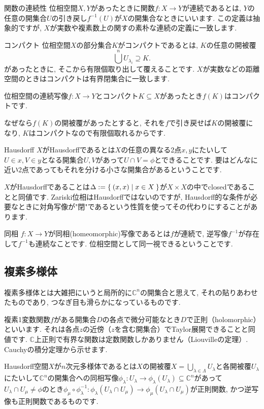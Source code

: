 \documentclass{jsarticle}
\newcommand{\CC}{\mathbb{C}}
\theoremstyle{definition}
\newcommand{\mydescription}[1]{
\begin{description}
\setlength{\itemindent}{2zw}
\setlength{\leftskip}{-2zw}
\setlength{\labelsep}{1zw}
#1
\end{description}
}
\numberwithin{theorem}{section}
\begin{document}
\mydescription{
\item[関数の連続性] 位相空間$X, Y$があったときに関数$f: X \rightarrow Y$が連続であるとは, $Y$の任意の開集合$U$の引き戻し$f^{-1}(U)$が$X$の開集合なときにいいます.
この定義は抽象的ですが, $X$が実数や複素数上の関すの素朴な連続の定義に一致します.

\item[コンパクト] 位相空間$X$の部分集合$K$がコンパクトであるとは, $K$の任意の開被覆
\[
\bigcup^n U_{\lambda_i} \supseteq K.
\]
があったときに, そこから有限個取り出して覆えることです.
$X$が実数などの距離空間のときはコンパクトは有界閉集合に一致します.

位相空間の連続写像$f: X \rightarrow Y$とコンパクト$K\subseteq X$があったとき$f(K)$はコンパクトです.

なぜなら$f(K)$の開被覆があったとすると, それを$f$で引き戻せば$K$の開被覆になり, $K$はコンパクトなので有限個取れるからです.

\item[Hausdorff] $X$がHausdorffであるとは$X$の任意の異なる2点$x, y$にたいして$U \in x, V \in y$となる開集合$U, V$があって$U \cap V = \phi$とできることです. 要はどんなに近い2点であってもそれを分ける小さな開集合があるということです.

$X$がHausdorffであることは$\Delta := \Set{(x, x) | x \in X}$が$X \times X$の中でclosedであることと同値です. Zariski位相はHausdorffではないのですが, Hausdorff的な条件が必要なときに対角写像が"閉"であるという性質を使ってその代わりにすることがあります.

\item[同相] $f: X \rightarrow Y$が同相(homeomorphic)写像であるとは$f$が連続で, 逆写像$f^{-1}$が存在して$f^{-1}$も連続なことです. 位相空間として同一視できるということです.
}

\subsection{複素多様体}
複素多様体とは大雑把にいうと局所的に$\CC^n$の開集合と思えて, それの貼りあわせたものであり, つなぎ目も滑らかになっているものです.

複素1変数関数$f$がある開集合$D$の各点で微分可能なとき$D$で正則（holomorphic）といいます. それは各点$z$の近傍（$z$を含む開集合）でTaylor展開できることと同値です. $\CC$上正則で有界な関数は定数関数しかありません（Liouvilleの定理）. Cauchyの積分定理から示せます.

 Hausdorff空間$X$が$n$次元多様体であるとは$X$の開被覆$X = \bigcup_{\lambda \in \Lambda} U_\lambda$と各開被覆$U_\lambda$にたいして$\CC^n$の開集合への同相写像$\phi_\lambda : U_\lambda \rightarrow \phi_\lambda(U_\lambda) \subseteq \CC^n$があって$U_\lambda \cap U_\mu \neq \phi$のとき$\phi_\mu\circ\phi_\lambda^{-1} : \phi_\lambda(U_\lambda\cap U_\mu) \rightarrow \phi_\mu(U_\lambda\cap U_\mu)$が正則関数, かつ逆写像も正則関数であるものです.
\end{document}
